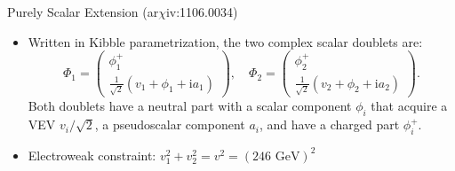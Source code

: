 \documentclass{../bredelebeamer}
\newcommand{\arxiv}{ar$\chi$iv:}
\begin{document}
\begin{frame}{Purely Scalar Extension (\arxiv 1106.0034)}
\begin{itemize}
          \vfill \pause
        \item Written in Kibble parametrization, the two complex scalar doublets are:
        \begin{equation*}
            \Phi_1=
            \begin{pmatrix}
                {{\phi_1^{+}}}\\
                {\frac{1}{\sqrt{2}}\left({v_1}+{\phi_1}+\mathrm{i} {a_1}\right)}
            \end{pmatrix}, 
            \quad \Phi_2=
            \begin{pmatrix}
                {\phi_2^{+}}\\
                {\frac{1}{\sqrt{2}}\left(v_2+\phi_2+\mathrm{i} a_2\right)}
            \end{pmatrix}.
        \end{equation*}
        Both doublets have a neutral part with a {scalar component $\phi_i$} that acquire a {VEV $v_i/\sqrt{2}$}, a {pseudoscalar component $a_i$},  and have a {charged part $\phi_i^+$}.
        \item Electroweak constraint: $v_1^2 + v_2^2 = v^2 = (246 \text{ GeV})^2$
    \end{itemize}
    
    
\end{frame}
\end{document}
